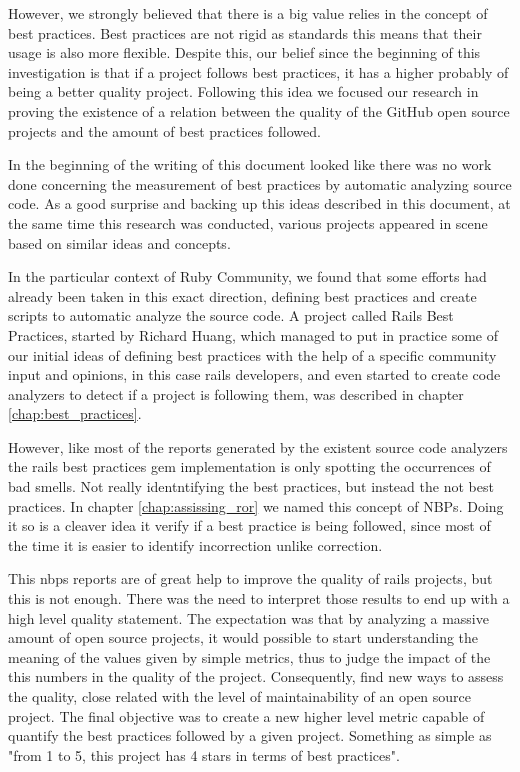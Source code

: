 However, we strongly believed that there is a big value relies in the concept of best practices.
Best practices are not rigid as standards this means that their usage is also more flexible.
Despite this, our belief since the beginning of this investigation is that if 
a project follows best practices, it has a higher probably of being a better quality project.
Following this idea we focused our research in proving the existence of
a relation between the quality of the GitHub open source projects and the amount of best practices followed.

In the beginning of the writing of this document looked like there was no work done 
concerning the measurement of best practices by automatic analyzing source code.
As a good surprise and backing up this ideas described in this document, at the same time this research was conducted, 
various projects appeared in scene based on similar ideas and concepts.

In the particular context of Ruby Community, we found that some efforts had already been taken in this exact direction,
defining best practices and create scripts to automatic analyze the source code.
A project called Rails Best Practices, started by Richard Huang, 
which managed to put in practice some of our initial ideas of defining best practices with 
the help of a specific community input and opinions, in this case rails developers,
and even started to create code analyzers to detect if a project is following them,
was described in chapter \ref{chap:best_practices}.

However, like most of the reports generated by the existent source code analyzers
the rails best practices gem implementation is only spotting the occurrences of bad smells.
Not really identntifying the best practices, but instead the not best practices. 
In chapter \ref{chap:assissing_ror} we named this concept of NBPs.
Doing it so is a cleaver idea it verify if a best practice is being followed, 
since most of the time it is easier to identify incorrection unlike correction.
 
This nbps reports are of great help to improve the quality of rails projects, but this is not enough.
There was the need to interpret those results to end up with a high level quality statement.
The expectation was that by analyzing a massive amount of open source projects, it would possible to start understanding
the meaning of the values given by simple metrics,
thus to judge the impact of the this numbers in the quality of the project. 
Consequently, find new ways to assess the quality, close related with the level of maintainability of an open source project.
The final objective was to create a new higher level metric capable of quantify the best practices followed by a given project.
Something as simple as "from 1 to 5, this project has 4 stars in terms of best practices".

